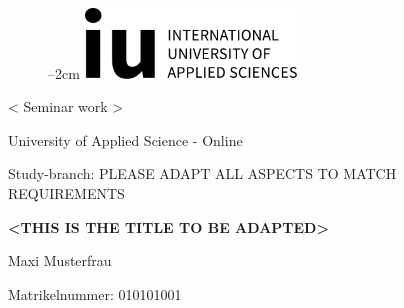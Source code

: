 
\label{titlePage}
\begin{figure}[h]
\centering
\advance\leftskip--2cm
\includegraphics[width=0.50\textwidth]{pics/logo.pdf}
\end{figure}
\FloatBarrier

\begin{Large} 
\begin{center}
< Seminar work >
\end{center}
\end{Large} 

\vspace*{5mm}

\begin{large} 
\begin{center}
University of Applied Science - Online
\end{center}
\end{large} 

\begin{large} 
\begin{center}
Study-branch: PLEASE ADAPT ALL ASPECTS TO MATCH REQUIREMENTS
\end{center}
\end{large}

\vspace*{15mm}

\begin{Large} 
\begin{center}
\textbf{<THIS IS THE TITLE TO BE ADAPTED>}
\end{center}
\end{Large}

\vspace*{15mm}

\begin{large} 
\begin{center}
Maxi Musterfrau
\end{center}
\end{large} 

\vspace*{-6mm}

\begin{large} 
\begin{center}
Matrikelnummer: 010101001
\end{center}
\end{large} 


